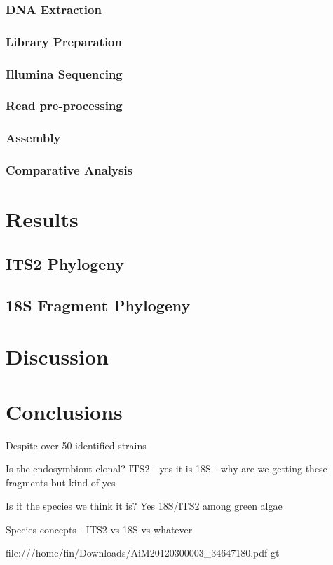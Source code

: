 \subsubsection{DNA Extraction}
\subsubsection{Library Preparation}
\subsubsection{Illumina Sequencing}
\subsubsection{Read pre-processing}
\subsubsection{Assembly}
\subsubsection{Comparative Analysis}


\section{Results}

\subsection{ITS2 Phylogeny}

\subsection{18S Fragment Phylogeny}

\subsection{}

\section{Discussion}

\section{Conclusions}





Despite over 50 identified strains 


Is the endosymbiont clonal?
ITS2 - yes it is
18S - why are we getting these fragments but kind of yes

Is it the species we think it is?
Yes 18S/ITS2 among green algae

Species concepts  - ITS2 vs 18S vs whatever \citep{Boenigk2012}

file:///home/fin/Downloads/AiM20120300003_34647180.pdf
gt

